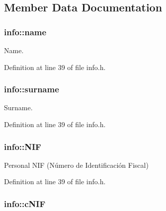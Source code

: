 \subsection{Member Data Documentation}
\hypertarget{classinfo_a27cfacf228447e06d83abd01882eb78d}{
\subsubsection[{name}]{\setlength{\rightskip}{0pt plus 5cm}info\+::name\hspace{0.3cm}{\ttfamily [private]}}}\label{classinfo_a27cfacf228447e06d83abd01882eb78d}


Name. 



Definition at line 39 of file info.\+h.

\hypertarget{classinfo_a9dd9f00d6b74f1d7b4519e509efd0031}{
\subsubsection[{surname}]{\setlength{\rightskip}{0pt plus 5cm}info\+::surname\hspace{0.3cm}{\ttfamily [private]}}}\label{classinfo_a9dd9f00d6b74f1d7b4519e509efd0031}


Surname. 



Definition at line 39 of file info.\+h.

\hypertarget{classinfo_a68e2c3e3e7e8e6df17e1f5b466506319}{
\subsubsection[{N\+I\+F}]{\setlength{\rightskip}{0pt plus 5cm}info\+::\+N\+I\+F\hspace{0.3cm}{\ttfamily [private]}}}\label{classinfo_a68e2c3e3e7e8e6df17e1f5b466506319}


Personal N\+I\+F (Número de Identificación Fiscal) 



Definition at line 39 of file info.\+h.

\hypertarget{classinfo_a46ee4d6a7e5976d795ed9efa02341fce}{
\subsubsection[{c\+N\+I\+F}]{\setlength{\rightskip}{0pt plus 5cm}info\+::c\+N\+I\+F\hspace{0.3cm}{\ttfamily [private]}}}\label{classinfo_a46ee4d6a7e5976d795ed9efa02341fce}


